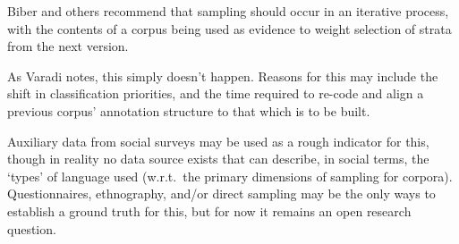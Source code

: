 Biber and others\cite{leech2006new,biber1993representativeness} recommend that sampling should occur in an iterative process, with the contents of a corpus being used as evidence to weight selection of strata from the next version.

As Varadi\cite{varadi2000corpus,varadi2001linguistic} notes, this simply doesn't happen.  Reasons for this may include the shift in classification priorities, and the time required to re-code and align a previous corpus' annotation structure to that which is to be built. 



Auxiliary data from social surveys may be used as a rough indicator for this, though in reality no data source exists that can describe, in social terms, the `types' of language used (w.r.t.\ the primary dimensions of sampling for corpora).  Questionnaires, ethnography, and/or direct sampling may be the only ways to establish a ground truth for this, but for now it remains an open research question.%









